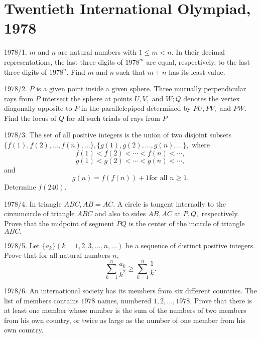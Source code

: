 \documentclass[12pt,thmsa]{article}
\begin{document}
\section{Twentieth International Olympiad, 1978}

1978/1. $m$ and $n$ are natural numbers with $1\le m<n.$ In their decimal
representations, the last three digits of $1978^{m}$ are equal,
respectively, to the last three digits of $1978^{n}$. Find $m$ and $n$ such
that $m+n$ has its least value.

1978/2. $P$ is a given point inside a given sphere. Three mutually
perpendicular rays from $P$ intersect the sphere at points $U,V,$ and $W;Q$
denotes the vertex diagonally opposite to $P$ in the parallelepiped
determined by $PU,PV,$ and $PW.$ Find the locus of $Q$ for all such triads
of rays from $P$

1978/3. The set of all positive integers is the union of two disjoint
subsets $\{f(1),f(2),...,f(n),...\},\{g(1),g(2),...,g(n),...\},$ where 
\[
f(1)<f(2)<\cdots <f(n)<\cdots , 
\]
\[
g(1)<g(2)<\cdots <g(n)<\cdots , 
\]
and 
\[
g(n)=f(f(n))+1\text{for all }n\ge 1. 
\]
Determine $f(240).$

1978/4. In triangle $ABC,AB=AC.$ A circle is tangent internally to the
circumcircle of triangle $ABC$ and also to sides $AB,AC$ at $P,Q,$
respectively. Prove that the midpoint of segment $PQ$ is the center of the
incircle of triangle $ABC.$

1978/5. Let $\{a_{k}\}(k=1,2,3,...,n,...)$ be a sequence of distinct
positive integers. Prove that for all natural numbers $n,$%
\[
\sum_{k=1}^{n}\frac{a_{k}}{k^{2}}\ge \sum_{k=1}^{n}\frac{1}{k}. 
\]

1978/6. An international society has its members from six different
countries. The list of members contains $1978$ names, numbered $1,2,...,1978.
$ Prove that there is at least one member whose number is the sum of the
numbers of two members from his own country, or twice as large as the number
of one member from his own country.
\end{document}
